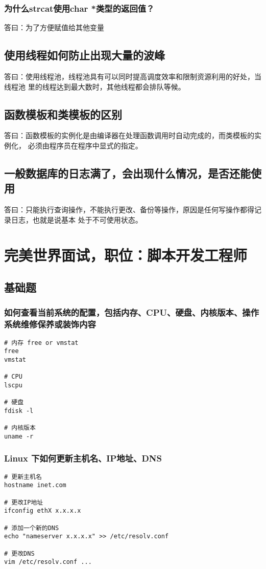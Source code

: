 \documentclass{article}
\begin{document}
\subsubsection{为什么strcat使用char *类型的返回值？}
答曰：为了方便赋值给其他变量

\subsection{使用线程如何防止出现大量的波峰}
答曰：使用线程池，线程池具有可以同时提高调度效率和限制资源利用的好处，当线程池
里的线程达到最大数时，其他线程都会排队等候。

\subsection{函数模板和类模板的区别}
答曰：函数模板的实例化是由编译器在处理函数调用时自动完成的，而类模板的实例化，
必须由程序员在程序中显式的指定。

\subsection{一般数据库的日志满了，会出现什么情况，是否还能使用}
答曰：只能执行查询操作，不能执行更改、备份等操作，原因是任何写操作都得记录日志，也就是说基本
处于不可使用状态。


\section{完美世界面试，职位：脚本开发工程师}
\subsection{基础题}
\subsubsection{如何查看当前系统的配置，包括内存、CPU、硬盘、内核版本、操作系统维修保养或装饰内容}
\begin{verbatim}
# 内存 free or vmstat
free
vmstat

# CPU
lscpu

# 硬盘
fdisk -l

# 内核版本 
uname -r
\end{verbatim}

\subsubsection{Linux 下如何更新主机名、IP地址、DNS}
\begin{verbatim}
# 更新主机名
hostname inet.com

# 更改IP地址
ifconfig ethX x.x.x.x

# 添加一个新的DNS
echo "nameserver x.x.x.x" >> /etc/resolv.conf

# 更改DNS
vim /etc/resolv.conf ...

\end{verbatim}
\end{document}
